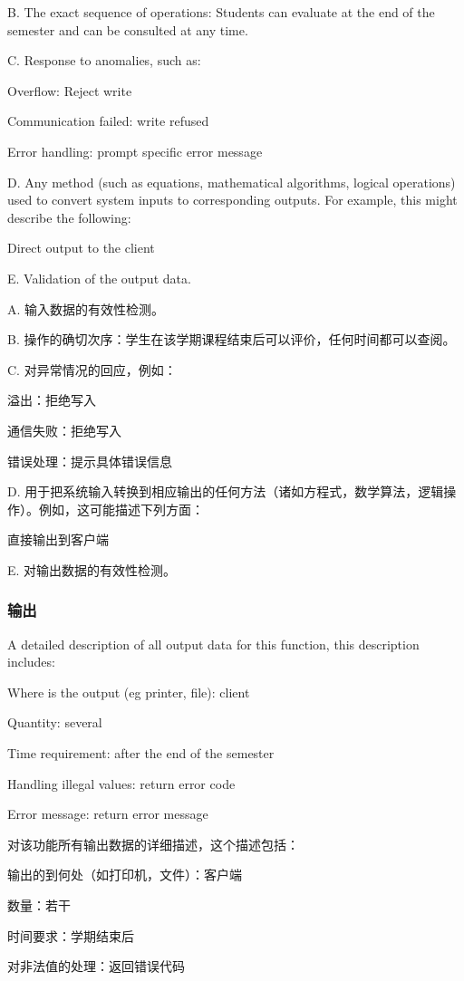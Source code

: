 B. The exact sequence of operations: Students can evaluate at the end of the semester and can be consulted at any time.

C. Response to anomalies, such as:

Overflow: Reject write

Communication failed: write refused

Error handling: prompt specific error message

D. Any method (such as equations, mathematical algorithms, logical operations) used to convert system inputs to corresponding outputs. For example, this might describe the following:

Direct output to the client

E. Validation of the output data.

A. 输入数据的有效性检测。

B. 操作的确切次序：学生在该学期课程结束后可以评价，任何时间都可以查阅。

C. 对异常情况的回应，例如：

	溢出：拒绝写入
	
	通信失败：拒绝写入
	
	错误处理：提示具体错误信息

D. 用于把系统输入转换到相应输出的任何方法（诸如方程式，数学算法，逻辑操作）。例如，这可能描述下列方面：

	直接输出到客户端

E.	对输出数据的有效性检测。
\subsubsection{输出}

A detailed description of all output data for this function, this description includes:

Where is the output (eg printer, file): client

Quantity: several

Time requirement: after the end of the semester

Handling illegal values: return error code

Error message: return error message

对该功能所有输出数据的详细描述，这个描述包括：
	
	输出的到何处（如打印机，文件）：客户端
	
	数量：若干
	
	时间要求：学期结束后
	
	对非法值的处理：返回错误代码
	
